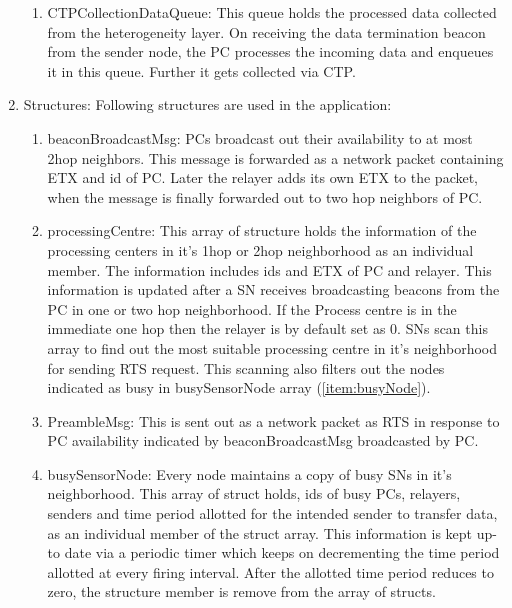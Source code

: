 \begin{enumerate}
\begin{enumerate}
                    \item CTPCollectionDataQueue: This queue holds the processed data collected from the heterogeneity layer. On receiving the data termination beacon from the sender node, the \ac{PC} processes the incoming data and enqueues it in this queue. Further it gets collected via \ac{CTP}.
                    
                \end{enumerate}
            
            \item Structures: Following structures are used in the application:
            
                \begin{enumerate}
                    \item beaconBroadcastMsg: \acp{PC} broadcast out their availability to at most 2hop neighbors. This message is forwarded as a network packet containing \ac{ETX} and id of \ac{PC}. Later the relayer adds its own \ac{ETX} to the packet, when the message is finally forwarded out to two hop neighbors of \ac{PC}.
                    
                    \item{\label{item:processingCentreStruct}} processingCentre: This array of structure holds the information of the processing centers in it's 1hop or 2hop neighborhood as an individual member. The information includes ids and \ac{ETX} of \ac{PC} and relayer. This information is updated after a \ac{SN} receives broadcasting beacons from the \ac{PC} in one or two hop neighborhood. If the Process centre is in the immediate one hop then the relayer is by default set as 0. \acp{SN} scan this array to find out the most suitable processing centre in it's neighborhood for sending \ac{RTS} request. This scanning also filters out the nodes indicated as busy in busySensorNode array (\ref{item:busyNode}).
                    
                    \item PreambleMsg: This is sent out as a network packet as \ac{RTS} in response to \ac{PC} availability indicated by beaconBroadcastMsg broadcasted by \ac{PC}. 
                    
                    \item{\label{item:busyNode}} busySensorNode: Every node maintains a copy of busy \acp{SN} in it's neighborhood. This array of struct holds, ids of busy \acp{PC}, relayers, senders and time period allotted for the intended sender to transfer data, as an individual member of the struct array. This information is kept up-to date via a periodic timer which keeps on decrementing the time period allotted at every firing interval. After the allotted time period reduces to zero, the structure member is remove from the array of structs.
                    

\end{enumerate}
\end{enumerate}

